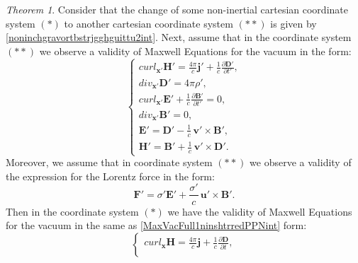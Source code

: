 \documentclass{article}
\newtheorem{theorem}{Theorem}[section]
\theoremstyle{definition}
\theoremstyle{remark}
\renewcommand{\vec}[1]{\mathbf{#1}}
\newcommand{\R}{\mathbb{R}}
\newcommand{\er}{\eqref}
\newcommand{\R}{{\mathbb{R}}}
\newcommand{\er}{\eqref}
\newtheorem{theorem}{Theorem}
\begin{document}
\begin{theorem}\label{gjghghgghgintint}
Consider that the change of some non-inertial cartesian coordinate
system $(*)$ to another cartesian coordinate system $(**)$ is given
by \er{noninchgravortbstrjgghguittu2int}. Next, assume that in the
coordinate system $(**)$ we observe a validity of Maxwell Equations
for the vacuum in the form:
\begin{equation}\label{MaxVacFull1ninshtrredPPNint}
\begin{cases}
curl_{\vec x'} \vec H'= \frac{4\pi}{c}\vec
j'+\frac{1}{c}\frac{\partial
\vec D'}{\partial t'},\\
div_{\vec x'} \vec D'= 4\pi\rho',\\
curl_{\vec x'} \vec E'+\frac{1}{c}\frac{\partial \vec B'}{\partial t'}= 0,\\
div_{\vec x'} \vec B'= 0,\\
\vec E'=\vec D'-\frac{1}{c}\,\vec v'\times \vec B',\\
\vec H'=\vec B'+\frac{1}{c}\,\vec v'\times \vec D'.
\end{cases}
\end{equation}
Moreover, we assume that in coordinate system $(**)$ we observe a
validity of the expression for the Lorentz force in the form:
\begin{equation}\label{LorenzChredPPNint}
\vec F'=\sigma' \vec E'+\frac{\sigma'}{c}\,\vec u'\times \vec B'.
\end{equation}
Then in the coordinate system $(*)$ we have the validity of Maxwell
Equations for the vacuum in the same as
\er{MaxVacFull1ninshtrredPPNint} form:
\begin{equation}\label{MaxVacFull1ninshtrhjkkredPPNint}
\begin{cases}
curl_{\vec x} \vec H= \frac{4\pi}{c}\vec j+\frac{1}{c}\frac{\partial
\vec D}{\partial t},\\

\end{cases}
\end{equation}
\end{theorem}
\end{document}
